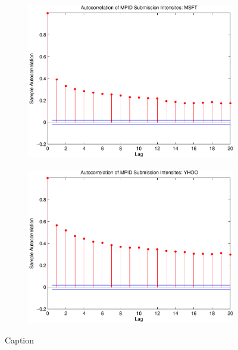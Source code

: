 \documentclass{article}
\begin{document}
\begin{figure}[htp!]
\begin{subfigure}{0.24\textwidth}
\includegraphics[width=\linewidth]{docs/Graphs_MPID_SUB_RATIO_MSFT_30sec_FullTime.pdf}
\end{subfigure}
\begin{subfigure}{0.24\textwidth}
\includegraphics[width=\linewidth]{docs/Graphs_MPID_SUB_RATIO_YHOO_30sec_FullTime.pdf}
\end{subfigure}
\begin{minipage}{\textwidth}
\footnotesize
Caption
\end{minipage}
\end{figure}
\end{document}
